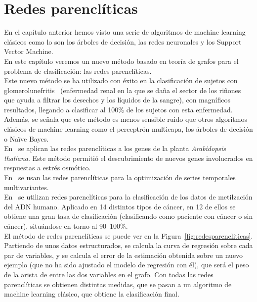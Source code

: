 \chapter{Redes parenclíticas}

En el capítulo anterior hemos visto una serie de algoritmos de machine learning clásicos como lo son los árboles de decisión, las redes neuronales y los Support Vector Machine.\\

En este capítulo veremos un nuevo método basado en teoría de grafos para el problema de clasificación: las redes parenclíticas.\\

Este nuevo método se ha utilizado con éxito en la clasificación de sujetos con glomerolunefritis~\cite{metabo3010155, 1304.1896} (enfermedad renal en la que se daña el sector de los riñones que ayuda a filtrar los desechos y los líquidos de la sangre), con magníficos resultados, llegando a clasificar al 100\% de los sujetos con esta enfermedad. Además, se señala que este método es menos sensible ruido que otros algoritmos clásicos de machine learning como el perceptrón multicapa, los árboles de decisión o Naïve Bayes.\\

En~\cite{Zanin2014} se aplican las redes parenclíticas a los genes de la planta \textit{Arabidopsis thaliana}. Este método permitió el descubrimiento de nuevos genes involucrados en respuestas a estrés osmótico.\\

En~\cite{Zanin2012} se usan las redes parenclíticas para la optimización de series temporales multivariantes.\\

En~\cite{1506.04421} se utilizan redes parenclíticas para la clasificación de los datos de metilzación del ADN humano. Aplicado en 14 distintos tipos de cáncer, en 12 de ellos se obtiene una gran tasa de clasificación (clasificando como paciente con cáncer o sin cáncer), situándose en torno al 90--100\%.\\

El método de redes parenclíticas se puede ver en la Figura~\ref{fig:redesparencliticas}. Partiendo de unos datos estructurados, se calcula la curva de regresión sobre cada par de variables, y se calcula el error de la estimación obtenida sobre un nuevo ejemplo (que no ha sido ajustado el modelo de regresión con él), que será el peso de la arista de entre las dos variables en el grafo. Con todas las redes parenclíticas se obtienen distintas medidas, que se pasan a un algoritmo de machine learning clásico, que obtiene la clasificación final.     

